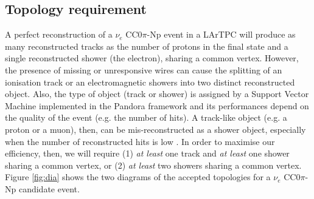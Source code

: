 \documentclass[a4paper]{article}
\begin{document}
\subsection{Topology requirement}
A perfect reconstruction of a $\nu_{e}$ CC0$\pi$-Np event in a LArTPC will produce as many reconstructed tracks as the number of protons in the final state and a single reconstructed shower (the electron), sharing a common vertex. However, the presence of missing or unresponsive wires can cause the splitting of an ionisation track or an electromagnetic showers into two distinct reconstructed object. Also, the type of object (track or shower) is assigned by a Support Vector Machine implemented in the Pandora framework and its performances depend on the quality of the event (e.g. the number of hits). A track-like object (e.g. a proton or a muon), then, can be mis-reconstructed as a shower object, especially when the number of reconstructed hits is low \cite{pandora2}. In order to maximise our efficiency, then, we will require (1) \emph{at least} one track and \emph{at least} one shower sharing a common vertex, or (2) \emph{at least} two showers sharing a common vertex. Figure \ref{fig:dia} shows the two diagrams of the accepted topologies for a $\nu_{e}$ CC0$\pi$-Np candidate event.
\end{document}
